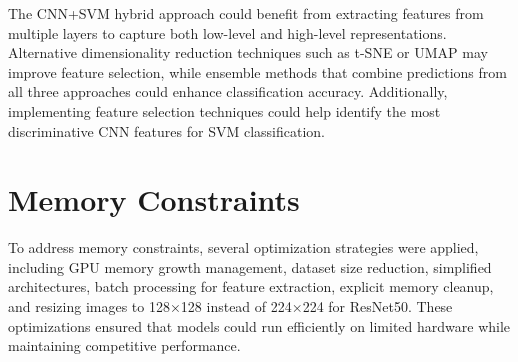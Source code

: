 \documentclass[12pt]{article}
\begin{document}
The CNN+SVM hybrid approach could benefit from extracting features from multiple layers to capture both low-level and high-level representations. Alternative dimensionality reduction techniques such as t-SNE or UMAP may improve feature selection, while ensemble methods that combine predictions from all three approaches could enhance classification accuracy. Additionally, implementing feature selection techniques could help identify the most discriminative CNN features for SVM classification.

\section{Memory Constraints}
To address memory constraints, several optimization strategies were applied, including GPU memory growth management, dataset size reduction, simplified architectures, batch processing for feature extraction, explicit memory cleanup, and resizing images to 128×128 instead of 224×224 for ResNet50. These optimizations ensured that models could run efficiently on limited hardware while maintaining competitive performance.
\end{document}
